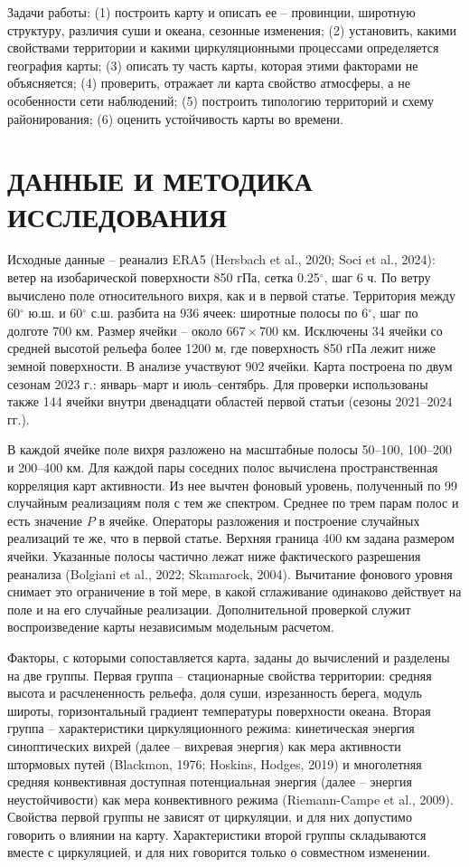\documentclass[12pt,a4paper]{article}
\begin{document}
Задачи работы: (1) построить карту и описать ее -- провинции, широтную структуру, различия суши и океана, сезонные изменения; (2) установить, какими свойствами территории и какими циркуляционными процессами определяется география карты; (3) описать ту часть карты, которая этими факторами не объясняется; (4) проверить, отражает ли карта свойство атмосферы, а не особенности сети наблюдений; (5) построить типологию территорий и схему районирования; (6) оценить устойчивость карты во времени.

\section{ДАННЫЕ И МЕТОДИКА ИССЛЕДОВАНИЯ}

Исходные данные -- реанализ ERA5 (Hersbach et al., 2020; Soci et al., 2024): ветер на изобарической поверхности 850 гПа, сетка 0.25$^\circ$, шаг 6 ч. По ветру вычислено поле относительного вихря, как и в первой статье. Территория между 60$^\circ$ ю.ш. и 60$^\circ$ с.ш. разбита на 936 ячеек: широтные полосы по 6$^\circ$, шаг по долготе 700 км. Размер ячейки -- около $667 \times 700$ км. Исключены 34 ячейки со средней высотой рельефа более 1200 м, где поверхность 850 гПа лежит ниже земной поверхности. В анализе участвуют 902 ячейки. Карта построена по двум сезонам 2023 г.: январь--март и июль--сентябрь. Для проверки использованы также 144 ячейки внутри двенадцати областей первой статьи (сезоны 2021--2024 гг.).

В каждой ячейке поле вихря разложено на масштабные полосы 50--100, 100--200 и 200--400 км. Для каждой пары соседних полос вычислена пространственная корреляция карт активности. Из нее вычтен фоновый уровень, полученный по 99 случайным реализациям поля с тем же спектром. Среднее по трем парам полос и есть значение $P$ в ячейке. Операторы разложения и построение случайных реализаций те же, что в первой статье. Верхняя граница 400 км задана размером ячейки. Указанные полосы частично лежат ниже фактического разрешения реанализа (Bolgiani et al., 2022; Skamarock, 2004). Вычитание фонового уровня снимает это ограничение в той мере, в какой сглаживание одинаково действует на поле и на его случайные реализации. Дополнительной проверкой служит воспроизведение карты независимым модельным расчетом.

Факторы, с которыми сопоставляется карта, заданы до вычислений и разделены на две группы. Первая группа -- стационарные свойства территории: средняя высота и расчлененность рельефа, доля суши, изрезанность берега, модуль широты, горизонтальный градиент температуры поверхности океана. Вторая группа -- характеристики циркуляционного режима: кинетическая энергия синоптических вихрей (далее -- вихревая энергия) как мера активности штормовых путей (Blackmon, 1976; Hoskins, Hodges, 2019) и многолетняя средняя конвективная доступная потенциальная энергия (далее -- энергия неустойчивости) как мера конвективного режима (Riemann-Campe et al., 2009). Свойства первой группы не зависят от циркуляции, и для них допустимо говорить о влиянии на карту. Характеристики второй группы складываются вместе с циркуляцией, и для них говорится только о совместном изменении.
\end{document}
